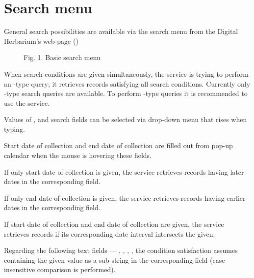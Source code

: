 \documentclass[letterpaper,10pt,english]{sphinxmanual}
\begin{document}
\section{Search menu}
\label{\detokenize{search_basics:search-menu}}
General search possibilities are available via the
search menu from the Digital Herbarium’s web-page
({\hyperref[\detokenize{search_basics:fig1}]{}})

\ignorespaces 
\begin{figure}[htbp]
\centering
\capstart

\noindent{}
\caption{Fig. 1. Basic search menu}\label{\detokenize{search_basics:fig1}}\label{\detokenize{search_basics:id1}}\end{figure}

When search conditions are given simultaneously, the service is trying to perform an -type
query; it retrieves records satisfying all search conditions. Currently  only -type
search queries are available. To perform -type queries  it is recommended
to use the {\hyperref[\detokenize{http_api::doc}]{}} service.

Values of ,  and  search fields can be
selected via drop-down menu that rises when typing.

Start date of collection and end date of collection
are filled out from pop-up calendar when the mouse is hovering
these fields.

If only start date of collection is given,  the service
retrieves records having later dates in the
corresponding field.

If only end date of collection is given,  the service
retrieves records having earlier dates in the
corresponding field.

If start date of collection and end date of collection are given,
the service retrieves records if its corresponding date interval
intersects the given.

Regarding the following text fields  —
, , , ,  the
condition satisfaction assumes containing the given value as a
sub-string in the corresponding field (case insensitive comparison is performed).
\end{document}
